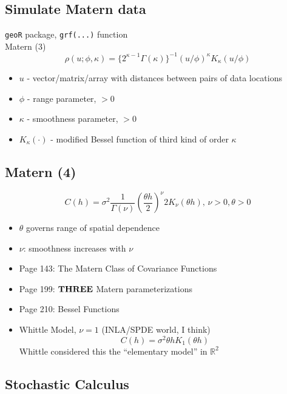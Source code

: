 \documentclass{article}
\begin{document}
\subsection*{Simulate Matern data}
\verb|geoR| package, \verb|grf(...)| function \\
Matern (3)
$$ \rho(u; \phi, \kappa) = \{2^{\kappa-1}\Gamma(\kappa)\}^{-1}(u/\phi)^{\kappa}K_{\kappa}(u/\phi)$$
  \begin{itemize}
  \item $u$ - vector/matrix/array with distances between pairs of data locations
  \item $\phi$ - range parameter, $>0$
  \item $\kappa$ - smoothness parameter, $>0$
  \item $K_{\kappa}(\cdot)$ - modified Bessel function of third kind of order $\kappa$
  \end{itemize}
  
\subsection*{Matern (4)}
\citep{Schabenberger2004}
$$ C(h) = \sigma^{2}\frac{1}{\Gamma(\nu)}\left(\frac{\theta h}{2}\right)^{\nu}2K_{\nu}(\theta h) \text{,   } \nu >0, \theta > 0 $$
\begin{itemize}
\item $\theta$ governs range of spatial dependence
\item $\nu$: smoothness increases with $\nu$
\item Page 143: The Matern Class of Covariance Functions
\item Page 199: ${\bf THREE}$ Matern parameterizations
\item Page 210: Bessel Functions
\item Whittle Model, $\nu = 1$ (INLA/SPDE world, I think)
$$ C(h) = \sigma^{2}\theta h K_{1}(\theta h) $$
Whittle considered this the ``elementary model'' in $\mathbb{R}^{2}$
\end{itemize}

\subsection*{Stochastic Calculus}
\end{document}
